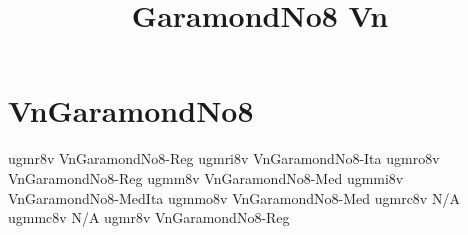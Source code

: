 \documentclass[sample]{vnsample}
\title{GaramondNo8 Vn}
\begin{document}
\section{VnGaramondNo8}
  {ugmr8v}   {VnGaramondNo8-Reg}
 {ugmri8v}  {VnGaramondNo8-Ita}
 {ugmro8v}  {VnGaramondNo8-Reg}
  {ugmm8v}   {VnGaramondNo8-Med}
 {ugmmi8v}  {VnGaramondNo8-MedIta}
 {ugmmo8v}  {VnGaramondNo8-Med}
 {ugmrc8v}  {N/A}
 {ugmmc8v}  {N/A}
  {ugmr8v}   {VnGaramondNo8-Reg}
\end{document}

